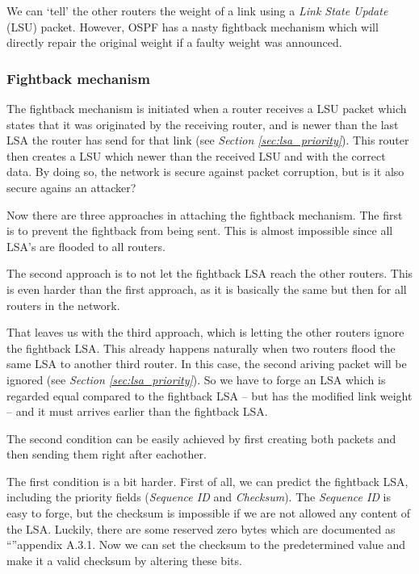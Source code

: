 \documentclass[11pt,a4paper,oneside]{article}
\newcommand{\lsubsubsection}[2]{\subsubsection{#1}\label{sec:#2}}
\begin{document}
    			We can `tell' the other routers the weight of a link using a \textit{Link State Update} (LSU) packet. However, OSPF has a nasty fightback mechanism which will directly repair the original weight if a faulty weight was announced.
    			
    			\lsubsubsection{Fightback mechanism}{fightback}
    				The fightback mechanism is initiated when a router receives a LSU packet which states that it was originated by the receiving router, and is newer than the last LSA the router has send for that link (see \textit{Section \ref{sec:lsa_priority}}). This router then creates a LSU which newer than the received LSU and with the correct data. By doing so, the network is secure against packet corruption, but is it also secure agains an attacker?
    				
    				Now there are three approaches in attaching the fightback mechanism. The first is to prevent the fightback from being sent. This is almost impossible since all LSA's are flooded to all routers.
    				
    				The second approach is to not let the fightback LSA reach the other routers. This is even harder than the first approach, as it is basically the same but then for all routers in the network.
    				
    				That leaves us with the third approach, which is letting the other routers ignore the fightback LSA. This already happens naturally when two routers flood the same LSA to another third router. In this case, the second ariving packet will be ignored (see \textit{Section \ref{sec:lsa_priority}}). So we have to forge an LSA which is regarded equal compared to the fightback LSA -- but has the modified link weight -- and it must arrives earlier than the fightback LSA.
    				
    				The second condition can be easily achieved by first creating both packets and then sending them right after eachother.
    				
    				The first condition is a bit harder. First of all, we can predict the fightback LSA, including the priority fields (\textit{Sequence ID} and \textit{Checksum}). The \textit{Sequence ID} is easy to forge, but the checksum is impossible if we are not allowed any content of the LSA. Luckily, there are some reserved zero bytes which are documented as \\``''\cite{rfc-5340}{appendix A.3.1}. Now we can set the checksum to the predetermined value and make it a valid checksum by altering these bits.
    				
\end{document}
